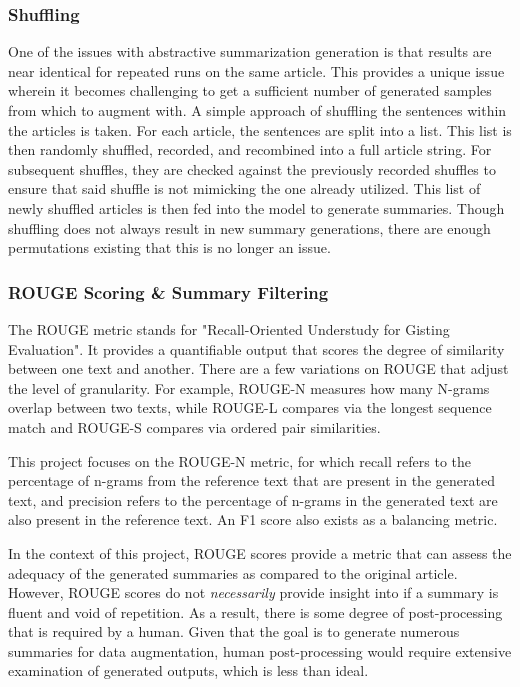\documentclass[12pt]{report}
\begin{document}
        \subsubsection{Shuffling}
            One of the issues with abstractive summarization generation is that results are near identical for repeated runs on the same article. This provides a unique issue wherein it becomes challenging to get a sufficient number of generated samples from which to augment with. A simple approach of shuffling the sentences within the articles is taken. For each article, the sentences are split into a list. This list is then randomly shuffled, recorded, and recombined into a full article string. For subsequent shuffles, they are checked against the previously recorded shuffles to ensure that said shuffle is not mimicking the one already utilized. This list of newly shuffled articles is then fed into the model to generate summaries. Though shuffling does not always result in new summary generations, there are enough permutations existing that this is no longer an issue.

        \subsubsection{ROUGE Scoring \& Summary Filtering}
        
        The ROUGE metric stands for "Recall-Oriented Understudy for Gisting Evaluation". It provides a quantifiable output that scores the degree of similarity between one text and another. There are a few variations on ROUGE that adjust the level of granularity. For example, ROUGE-N measures how many N-grams overlap between two texts, while ROUGE-L compares via the longest sequence match and ROUGE-S compares via ordered pair similarities.
            
            This project focuses on the ROUGE-N metric, for which recall refers to the percentage of n-grams from the reference text that are present in the generated text, and precision refers to the percentage of n-grams in the generated text are also present in the reference text. An F1 score also exists as a balancing metric.
            
            In the context of this project, ROUGE scores provide a metric that can assess the adequacy of the generated summaries as compared to the original article. However, ROUGE scores do not \textit{necessarily} provide insight into if a summary is fluent and void of repetition. As a result, there is some degree of post-processing that is required by a human. Given that the goal is to generate numerous summaries for data augmentation, human post-processing would require extensive examination of generated outputs, which is less than ideal.
            
\end{document}
